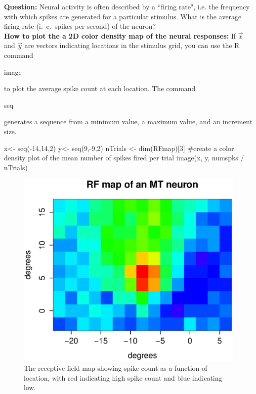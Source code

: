 \documentclass[
letterpaper, %
11pt, %
 oneside, 
onecolumn, %
]{memoir}
\numberwithin{Exercise}{chapter}
\begin{document}
\textbf{Question:}  Neural activity is often described by a ``firing rate", i.e. the frequency with which spikes are generated for a particular stimulus.  What is the average firing rate (i.\ e.\  spikes per second) of the neuron? \\


\textbf{ How to plot the a 2D color density map of the neural responses:  }
If $\vec{x}$ and $\vec{y}$ are vectors indicating locations in the stimulus grid, you can use the R command 
\begin{ttfamily}image\end{ttfamily} to plot the average spike count at each location.  The command 
 \begin{ttfamily}seq\end{ttfamily} generates a sequence from a minimum value, a maximum value, and an increment size.



\begin{shortrcode}
x<- seq(-14,14,2)
y<- seq(9,-9,2)
nTrials <- dim(RFmap)[3] 
#create a color density plot of the mean number of spikes fired per trial
image(x, y, numspks / nTrials)   
\end{shortrcode}

\begin{figure}[!ht]
\centering
\includegraphics[scale=0.7]{rfmap}
\caption{ The receptive field map showing spike count as a function of location, with red indicating high spike count and blue indicating low.} 
\end{figure}
\end{document}
